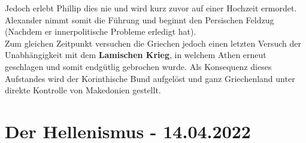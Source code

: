 \documentclass{article}
\begin{document}
	Jedoch erlebt Phillip dies nie und wird kurz zuvor auf einer Hochzeit ermordet. Alexander nimmt somit die Führung und beginnt den Persischen Feldzug (Nachdem er innerpolitische Probleme erledigt hat). \\
	Zum gleichen Zeitpunkt versuchen die Griechen jedoch einen letzten Versuch der Unabhängigkeit mit dem \textbf{Lamischen Krieg}, in welchem Athen erneut geschlagen und somit endgütlig gebrochen wurde. Als Konsequenz dieses Aufstandes wird der Korinthische Bund aufgelöst und ganz Griechenland unter direkte Kontrolle von Makedonien gestellt. \\
	\section{Der Hellenismus - 14.04.2022}
	
\end{document}

